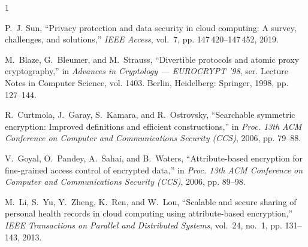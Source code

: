 \documentclass[10pt,twocolumn]{article}
\begin{document}
\begin{thebibliography}{1}

P.~J. Sun, ``Privacy protection and data security in cloud computing: A survey, challenges, and solutions,'' \emph{IEEE Access}, vol.~7, pp. 147\,420--147\,452, 2019.

M.~Blaze, G.~Bleumer, and M.~Strauss, ``Divertible protocols and atomic proxy cryptography,'' in \emph{Advances in Cryptology --- EUROCRYPT '98}, ser. Lecture Notes in Computer Science, vol. 1403. Berlin, Heidelberg: Springer, 1998, pp. 127--144.

R.~Curtmola, J.~Garay, S.~Kamara, and R.~Ostrovsky, ``Searchable symmetric encryption: Improved definitions and efficient constructions,'' in \emph{Proc. 13th ACM Conference on Computer and Communications Security (CCS)}, 2006, pp. 79--88.

V.~Goyal, O.~Pandey, A.~Sahai, and B.~Waters, ``Attribute-based encryption for fine-grained access control of encrypted data,'' in \emph{Proc. 13th ACM Conference on Computer and Communications Security (CCS)}, 2006, pp. 89--98.

M.~Li, S.~Yu, Y.~Zheng, K.~Ren, and W.~Lou, ``Scalable and secure sharing of personal health records in cloud computing using attribute-based encryption,'' \emph{IEEE Transactions on Parallel and Distributed Systems}, vol.~24, no.~1, pp. 131--143, 2013.

\end{thebibliography}
\end{document}
